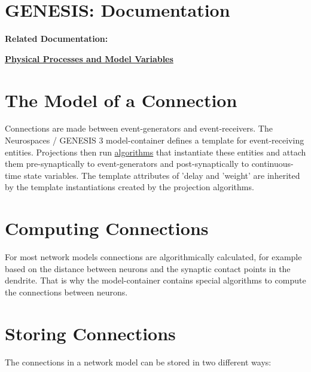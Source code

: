 \documentclass[12pt]{article}
\begin{document}
\section*{GENESIS: Documentation}

{\bf Related Documentation:}

\href{../model-variables/model-variables.tex}{\bf Physical Processes and Model Variables}


\section*{The Model of a Connection}

Connections are made between event-generators and event-receivers.
The Neurospaces / GENESIS 3 model-container defines a template for
event-receiving entities.  Projections then run
\href{../ndf-procedural-description/ndf-procedural-description.tex}{algorithms}
that instantiate these entities and attach them pre-synaptically to
event-generators and post-synaptically to continuous-time state
variables.  The template attributes of 'delay and 'weight' are
inherited by the template instantiations created by the projection
algorithms.



\section*{Computing Connections}

For most network models connections are algorithmically calculated,
for example based on the distance between neurons and the synaptic
contact points in the dendrite.  That is why the model-container
contains special {algorithms} to compute the connections between
neurons.

\section*{Storing Connections}

The connections in a network model can be stored in two different ways:
\end{document}
